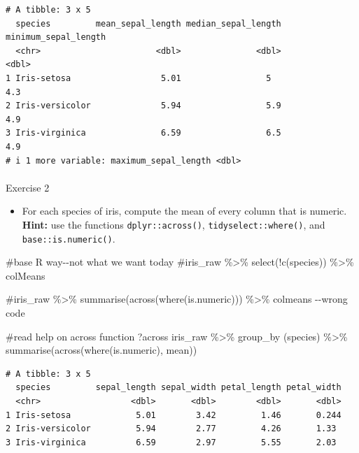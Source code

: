 \documentclass[
  letterpaper,
  DIV=11,
  numbers=noendperiod]{scrartcl}
\makeatletter
\let\oldparagraph\paragraph
\renewcommand{\paragraph}{
    \@ifstar
      \xxxParagraphStar
      \xxxParagraphNoStar
  }
\newcommand{\xxxParagraphStar}[1]{\oldparagraph*{#1}\mbox{}}
\newcommand{\xxxParagraphNoStar}[1]{\oldparagraph{#1}\mbox{}}
\newenvironment{Shaded}{\begin{snugshade}}{\end{snugshade}}
\newcommand{\CommentTok}[1]{\textcolor[rgb]{0.37,0.37,0.37}{#1}}
\newcommand{\FunctionTok}[1]{\textcolor[rgb]{0.28,0.35,0.67}{#1}}
\newcommand{\NormalTok}[1]{\textcolor[rgb]{0.00,0.23,0.31}{#1}}
\newcommand{\SpecialCharTok}[1]{\textcolor[rgb]{0.37,0.37,0.37}{#1}}
\providecommand{\tightlist}{%
  \setlength{\itemsep}{0pt}\setlength{\parskip}{0pt}}\usepackage{longtable,booktabs,array}
\makeatother
\begin{document}
\begin{verbatim}
# A tibble: 3 x 5
  species         mean_sepal_length median_sepal_length minimum_sepal_length
  <chr>                       <dbl>               <dbl>                <dbl>
1 Iris-setosa                  5.01                 5                    4.3
2 Iris-versicolor              5.94                 5.9                  4.9
3 Iris-virginica               6.59                 6.5                  4.9
# i 1 more variable: maximum_sepal_length <dbl>
\end{verbatim}

\paragraph{Exercise 2}\label{exercise-2}

\begin{itemize}
\tightlist
\item
  For each species of iris, compute the mean of every column that is
  numeric. \textbf{Hint:} use the functions \texttt{dplyr::across()},
  \texttt{tidyselect::where()}, and \texttt{base::is.numeric()}.
\end{itemize}

\begin{Shaded}
\begin{Highlighting}[]
\CommentTok{\#base R way{-}{-}not what we want today}
\CommentTok{\#iris\_raw \%\textgreater{}\% select(!c(species)) \%\textgreater{}\% colMeans}
  
\CommentTok{\#iris\_raw \%\textgreater{}\% summarise(across(where(is.numeric))) \%\textgreater{}\% colmeans    {-}{-}wrong code}

\CommentTok{\#read help on across function ?across}
\NormalTok{iris\_raw }\SpecialCharTok{\%\textgreater{}\%} \FunctionTok{group\_by}\NormalTok{ (species) }\SpecialCharTok{\%\textgreater{}\%} \FunctionTok{summarise}\NormalTok{(}\FunctionTok{across}\NormalTok{(}\FunctionTok{where}\NormalTok{(is.numeric), mean))}
\end{Highlighting}
\end{Shaded}

\begin{verbatim}
# A tibble: 3 x 5
  species         sepal_length sepal_width petal_length petal_width
  <chr>                  <dbl>       <dbl>        <dbl>       <dbl>
1 Iris-setosa             5.01        3.42         1.46       0.244
2 Iris-versicolor         5.94        2.77         4.26       1.33 
3 Iris-virginica          6.59        2.97         5.55       2.03 
\end{verbatim}
\end{document}
